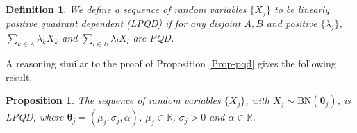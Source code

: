 \documentclass[12pt]{article}
\newtheorem{proposition}[theorem]{Proposition}
\newtheorem{definition}[theorem]{Definition}
\theoremstyle{definition}
\begin{document}
\begin{definition}
We define a sequence of random variables $\{X_j\}$ to be
linearly positive quadrant dependent (LPQD) if for any disjoint $A,B$ and positive $\{\lambda_j\}$, $\sum_{k\in A} \lambda_k X_k$
and $\sum_{l\in B} \lambda_l X_l$ are PQD.
\end{definition}

A reasoning similar to the proof of 
Proposition \ref{Prop-pqd} gives the following result.
\begin{proposition}\label{Prop-lpqd}
	The sequence of random variables $\{X_j\}$, with $X_j\sim \text{BN}(\boldsymbol{\theta}_j)$, is LPQD, where
	$\boldsymbol{\theta}_j=(\mu_j,\sigma_j,\alpha)$, $\mu_j\in\mathbb{R}$, $\sigma_j>0$ and $\alpha\in \mathbb{R}$.
\end{proposition}
\end{document}
